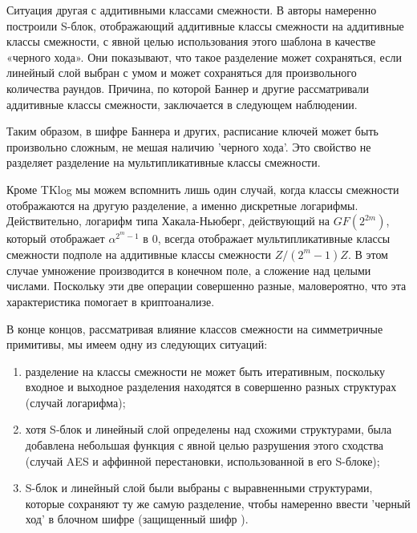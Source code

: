 Ситуация другая с аддитивными классами смежности. В \cite{BBF16} авторы намеренно построили S-блок, отображающий аддитивные классы смежности на аддитивные классы смежности, с явной целью использования этого шаблона в качестве «черного хода». Они показывают, что такое разделение может сохраняться, если линейный слой выбран с умом и может сохраняться для произвольного количества раундов. Причина, по которой Баннер и другие рассматривали аддитивные классы смежности, заключается в следующем наблюдении.


Таким образом, в шифре Баннера и других, расписание ключей может быть произвольно сложным, не мешая наличию 'черного хода'. Это свойство не разделяет разделение на мультипликативные классы смежности.

Кроме TKlog мы можем вспомнить лишь один случай, когда классы смежности отображаются на другую разделение, а именно дискретные логарифмы. Действительно, логарифм типа Хакала-Ньюберг, действующий на $GF(2^{2m})$, который отображает \(\alpha^{2^m-1}\) в $0$, всегда отображает мультипликативные классы смежности подполе на аддитивные классы смежности $Z/(2^m - 1)Z$. В этом случае умножение производится в конечном поле, а сложение над целыми числами. Поскольку эти две операции совершенно разные, маловероятно, что эта характеристика помогает в криптоанализе.

В конце концов, рассматривая влияние классов смежности на симметричные примитивы, мы имеем одну из следующих ситуаций:
\begin{enumerate}
    \item разделение на классы смежности не может быть итеративным, поскольку входное и выходное разделения находятся в совершенно разных структурах (случай логарифма);
    \item хотя S-блок и линейный слой определены над схожими структурами, была добавлена небольшая функция с явной целью разрушения этого сходства (случай AES и аффинной перестановки, использованной в его S-блоке);
    \item S-блок и линейный слой были выбраны с выравненными структурами, которые сохраняют ту же самую разделение, чтобы намеренно ввести 'черный ход' в блочном шифре (защищенный шифр \cite{BBF16}).
\end{enumerate}

